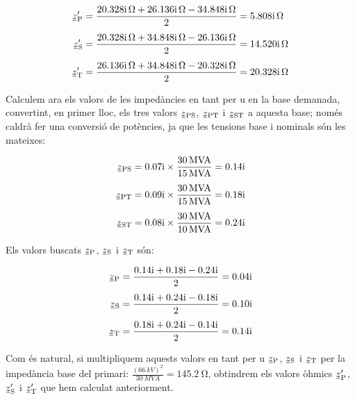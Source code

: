\begin{exemple}[\ImpCircEqTrafoTresDeb{}]
    \begin{align*}
        \cmplx{z}\ped{P}' &=  \frac{\complexqty{j 20,328}{\ohm} + \complexqty{j 26,136}{\ohm} - \complexqty{j 34,848}{\ohm}}{2} = \complexqty{j 5,808}{\ohm} \\[1ex]
        \cmplx{z}\ped{S}' &=  \frac{\complexqty{j 20,328}{\ohm} + \complexqty{j 34,848}{\ohm} - \complexqty{j 26,136}{\ohm}}{2} = \complexqty{j 14,520}{\ohm} \\[1ex]
        \cmplx{z}\ped{T}' &=  \frac{\complexqty{j 26,136}{\ohm} + \complexqty{j 34,848}{\ohm} - \complexqty{j 20,328}{\ohm}}{2} = \complexqty{j 20,328}{\ohm}
    \end{align*}

    Calculem ara els valors de les impedàncies en tant per u en la base demanada, convertint, en primer lloc, els tres valors $\cmplx{z}\ped{PS}$, $\cmplx{z}\ped{PT}$ i $\cmplx{z}\ped{ST}$ a aquesta base; només caldrà fer una conversió de potències, ja que les tensions base i nominals són les mateixes:

    \begin{align*}
        \cmplx{z}\ped{PS} &=  \complexnum{j 0,07} \times \frac{\qty{30}{MVA}}{\qty{15}{MVA}} = \complexnum{j 0,14}\\[1ex]
        \cmplx{z}\ped{PT} &=  \complexnum{j 0,09} \times \frac{\qty{30}{MVA}}{\qty{15}{MVA}} = \complexnum{j 0,18}\\[1ex]
        \cmplx{z}\ped{ST} &=  \complexnum{j 0,08} \times \frac{\qty{30}{MVA}}{\qty{10}{MVA}} = \complexnum{j 0,24}
    \end{align*}

    Els valors buscats $\cmplx{z}\ped{P}$, $\cmplx{z}\ped{S}$ i $\cmplx{z}\ped{T}$ són:

    \begin{align*}
        \cmplx{z}\ped{P} &=  \frac{\complexnum{j 0,14} + \complexnum{j 0,18} - \complexnum{j 0,24}}{2} = \complexnum{j 0,04} \\[1ex]
        \cmplx{z}\ped{S} &=  \frac{\complexnum{j 0,14} + \complexnum{j 0,24} - \complexnum{j 0,18}}{2} = \complexnum{j 0,10} \\[1ex]
        \cmplx{z}\ped{T} &=  \frac{\complexnum{j 0,18} + \complexnum{j 0,24} - \complexnum{j 0,14}}{2} = \complexnum{j 0,14}
    \end{align*}

     Com és natural, si multipliquem aquests valors en tant per u  $\cmplx{z}\ped{P}$, $\cmplx{z}\ped{S}$ i $\cmplx{z}\ped{T}$ per la impedància base del primari: $\frac{(\qty{66}{kV})^2}{\qty{30}{MVA}}=\qty{145,2}{\ohm}$, obtindrem els valors òhmics $\cmplx{z}\ped{P}'$,     $\cmplx{z}\ped{S}'$ i $\cmplx{z}\ped{T}'$ que hem calculat anteriorment.

\end{exemple}



